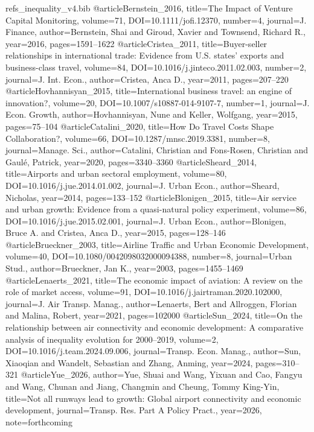 \begin{filecontents*}[overwrite]{refs_inequality_v4.bib}
@article{Bernstein_2016, title={The Impact of Venture Capital Monitoring}, volume={71}, DOI={10.1111/jofi.12370}, number={4}, journal={J. Finance}, author={Bernstein, Shai and Giroud, Xavier and Townsend, Richard R.}, year={2016}, pages={1591--1622} }
@article{Cristea_2011, title={Buyer-seller relationships in international trade: Evidence from {U.S.} states' exports and business-class travel}, volume={84}, DOI={10.1016/j.jinteco.2011.02.003}, number={2}, journal={J. Int. Econ.}, author={Cristea, Anca D.}, year={2011}, pages={207--220} }
@article{Hovhannisyan_2015, title={International business travel: an engine of innovation?}, volume={20}, DOI={10.1007/s10887-014-9107-7}, number={1}, journal={J. Econ. Growth}, author={Hovhannisyan, Nune and Keller, Wolfgang}, year={2015}, pages={75--104} }
@article{Catalini_2020, title={How Do Travel Costs Shape Collaboration?}, volume={66}, DOI={10.1287/mnsc.2019.3381}, number={8}, journal={Manage. Sci.}, author={Catalini, Christian and Fons-Rosen, Christian and Gaul\'e, Patrick}, year={2020}, pages={3340--3360} }
@article{Sheard_2014, title={Airports and urban sectoral employment}, volume={80}, DOI={10.1016/j.jue.2014.01.002}, journal={J. Urban Econ.}, author={Sheard, Nicholas}, year={2014}, pages={133--152} }
@article{Blonigen_2015, title={Air service and urban growth: Evidence from a quasi-natural policy experiment}, volume={86}, DOI={10.1016/j.jue.2015.02.001}, journal={J. Urban Econ.}, author={Blonigen, Bruce A. and Cristea, Anca D.}, year={2015}, pages={128--146} }
@article{Brueckner_2003, title={Airline Traffic and Urban Economic Development}, volume={40}, DOI={10.1080/0042098032000094388}, number={8}, journal={Urban Stud.}, author={Brueckner, Jan K.}, year={2003}, pages={1455--1469} }
@article{Lenaerts_2021, title={The economic impact of aviation: A review on the role of market access}, volume={91}, DOI={10.1016/j.jairtraman.2020.102000}, journal={J. Air Transp. Manag.}, author={Lenaerts, Bert and Allroggen, Florian and Malina, Robert}, year={2021}, pages={102000} }
@article{Sun_2024, title={On the relationship between air connectivity and economic development: A comparative analysis of inequality evolution for 2000--2019}, volume={2}, DOI={10.1016/j.team.2024.09.006}, journal={Transp. Econ. Manag.}, author={Sun, Xiaoqian and Wandelt, Sebastian and Zhang, Anming}, year={2024}, pages={310--321} }
@article{Yue_2026, author={Yue, Shuai and Wang, Yixuan and Cao, Fangyu and Wang, Chunan and Jiang, Changmin and Cheung, Tommy King-Yin}, title={Not all runways lead to growth: Global airport connectivity and economic development}, journal={Transp. Res. Part A Policy Pract.}, year={2026}, note={forthcoming} }

\end{filecontents*}
